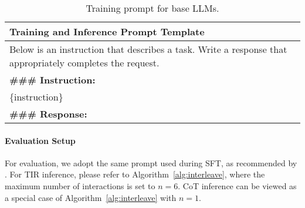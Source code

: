 \begin{table*}[htbp]
    \centering
    \footnotesize
    \begin{tabularx}{\textwidth}{|X|}
        \hline
        \textbf{Training and Inference Prompt Template} \\ 
        \hline
        Below is an instruction that describes a task. Write a response that appropriately completes the request. \\[5pt]
        \textbf{\#\#\# Instruction:} \\ 
        \{instruction\} \\[5pt]
        \textbf{\#\#\# Response:} \\[5pt]
        \hline
    \end{tabularx}
    \caption{Training prompt for base LLMs.}
    \label{tabapp:train_prompt}
\end{table*}


\paragraph{Evaluation Setup}
For evaluation, we adopt the same prompt used during SFT, as recommended by \citet{dartmath2024tong}. 
For TIR inference, please refer to Algorithm~\ref{alg:interleave}, where the maximum number of interactions is set to $n = 6$.
CoT inference can be viewed as a special case of Algorithm~\ref{alg:interleave} with $n = 1$.